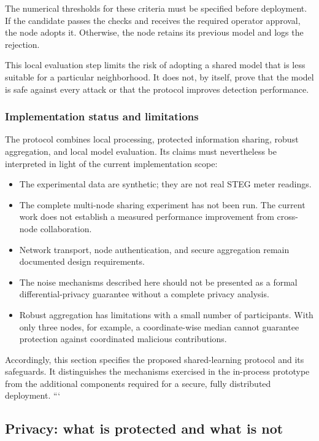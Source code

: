\documentclass[11pt,a4paper]{article}
\begin{document}
The numerical thresholds for these criteria must be specified before
deployment. If the candidate passes the checks and receives the
required operator approval, the node adopts it. Otherwise, the node
retains its previous model and logs the rejection.

This local evaluation step limits the risk of adopting a shared model
that is less suitable for a particular neighborhood. It does not,
by itself, prove that the model is safe against every attack or that
the protocol improves detection performance.

\subsubsection{Implementation status and limitations}

The protocol combines local processing, protected information
sharing, robust aggregation, and local model evaluation. Its claims
must nevertheless be interpreted in light of the current
implementation scope:
\begin{itemize}
    \item The experimental data are synthetic; they are not real
    STEG meter readings.
    \item The complete multi-node sharing experiment has not been run.
    The current work does not establish a measured performance
    improvement from cross-node collaboration.
    \item Network transport, node authentication, and secure
    aggregation remain documented design requirements.
    \item The noise mechanisms described here should not be presented
    as a formal differential-privacy guarantee without a complete
    privacy analysis.
    \item Robust aggregation has limitations with a small number of
    participants. With only three nodes, for example, a coordinate-wise
    median cannot guarantee protection against coordinated malicious
    contributions.
\end{itemize}

Accordingly, this section specifies the proposed shared-learning
protocol and its safeguards. It distinguishes the mechanisms exercised
in the in-process prototype from the additional components required
for a secure, fully distributed deployment.
```
\subsection{Privacy: what is protected and what is not}
\end{document}
